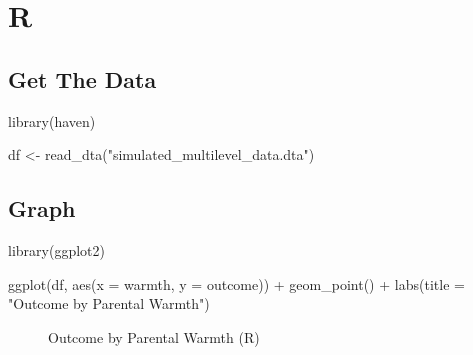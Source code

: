 \documentclass[
  letterpaper,
  DIV=11,
  numbers=noendperiod]{scrreprt}
\newenvironment{Shaded}{\begin{snugshade}}{\end{snugshade}}
\newcommand{\AttributeTok}[1]{\textcolor[rgb]{0.40,0.45,0.13}{#1}}
\newcommand{\FunctionTok}[1]{\textcolor[rgb]{0.28,0.35,0.67}{#1}}
\newcommand{\NormalTok}[1]{\textcolor[rgb]{0.00,0.23,0.31}{#1}}
\newcommand{\OtherTok}[1]{\textcolor[rgb]{0.00,0.23,0.31}{#1}}
\newcommand{\SpecialCharTok}[1]{\textcolor[rgb]{0.37,0.37,0.37}{#1}}
\newcommand{\StringTok}[1]{\textcolor[rgb]{0.13,0.47,0.30}{#1}}
\begin{document}
\section{R}

\subsection{Get The Data}\label{get-the-data-1}

\begin{Shaded}
\begin{Highlighting}[]
\FunctionTok{library}\NormalTok{(haven)}

\NormalTok{df }\OtherTok{\textless{}{-}} \FunctionTok{read\_dta}\NormalTok{(}\StringTok{"simulated\_multilevel\_data.dta"}\NormalTok{)}
\end{Highlighting}
\end{Shaded}

\subsection{Graph}\label{graph-1}

\begin{Shaded}
\begin{Highlighting}[]
\FunctionTok{library}\NormalTok{(ggplot2)}

\FunctionTok{ggplot}\NormalTok{(df,}
       \FunctionTok{aes}\NormalTok{(}\AttributeTok{x =}\NormalTok{ warmth,}
           \AttributeTok{y =}\NormalTok{ outcome)) }\SpecialCharTok{+}
  \FunctionTok{geom\_point}\NormalTok{() }\SpecialCharTok{+}
  \FunctionTok{labs}\NormalTok{(}\AttributeTok{title =} \StringTok{"Outcome by Parental Warmth"}\NormalTok{)}
\end{Highlighting}
\end{Shaded}

\begin{figure}[H]


\caption{\label{fig-R}Outcome by Parental Warmth (R)}

\end{figure}%
\end{document}
